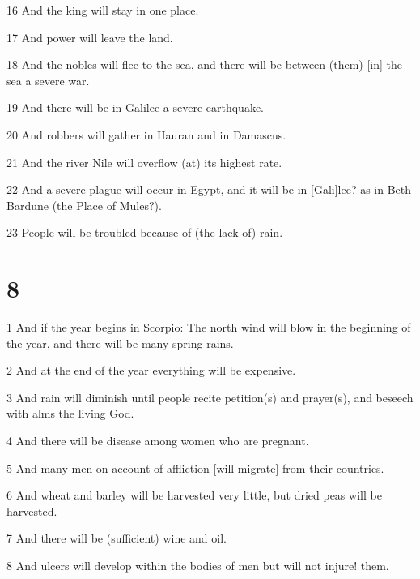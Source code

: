 \par 16 And the king will stay in one place. 

\par 17 And power will leave the land.

\par 18 And the nobles will flee to the sea, and there will be between (them) [in] the {sea} a severe war. 

\par 19 And there will be in Galilee a severe earthquake.

\par 20 And robbers will gather in Hauran and in Damascus.

\par 21 And the river Nile will overflow (at) its highest rate.

\par 22 And a severe plague will occur in Egypt, and it will be in [Gali]lee? as in Beth Bardune (the Place of Mules?). 

\par 23 People will be troubled because of (the lack of) rain. 

\chapter{8}

\par 1 And if the year begins in Scorpio: The north wind will blow in the beginning of the year, and there will be many spring rains. 

\par 2 And at the end of the year everything will be expensive. 

\par 3 And rain will diminish until people recite petition(s) and prayer(s), and beseech with alms the living God. 

\par 4 And there will be disease among women who are pregnant. 

\par 5 And many men on account of affliction [will migrate] from their countries. 

\par 6 And wheat and barley will be harvested very little, but dried peas will be harvested. 

\par 7 And there will be (sufficient) wine and oil. 

\par 8 And ulcers will develop within the bodies of men but will not injure! them. 

